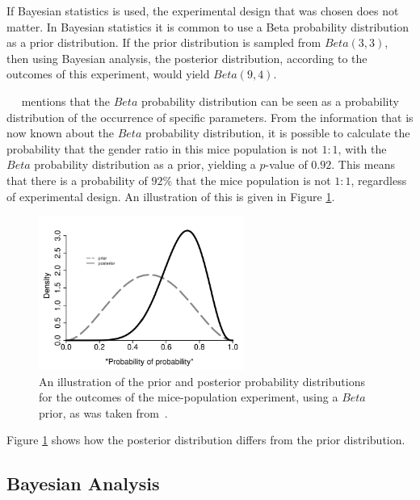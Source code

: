 If Bayesian statistics is used, the experimental design that was chosen does not matter. In Bayesian statistics it is common to use a Beta probability distribution as a prior distribution. If the prior distribution is sampled from $Beta(3,3)$, then using Bayesian analysis, the posterior distribution, according to the outcomes of this experiment, would yield $Beta(9,4)$.

~\citeauthor{ref:hackenberger:2019}~\cite{ref:hackenberger:2019} mentions that the $Beta$ probability distribution can be seen as a probability distribution of the occurrence of specific parameters. From the information that is now known about the $Beta$ probability distribution, it is possible to calculate the probability that the gender ratio in this mice population is not $1:1$, with the $Beta$ probability distribution as a prior, yielding a $p$-value of $0.92$. This means that there is a probability of $92\%$ that the mice population is not $1:1$, regardless of experimental design. An illustration of this is given in Figure \ref{fig:probability:bayesian_statistics:mouse_distributions}.

\begin{figure}[htbp]
	\centering
	\includegraphics[width=0.6\textwidth]{images/mouse_experiment_distributions.pdf}
	\caption{An illustration of the prior and posterior probability distributions for the outcomes of the mice-population experiment, using a $Beta$ prior, as was taken from~\cite{ref:hackenberger:2019}.}
	\label{fig:probability:bayesian_statistics:mouse_distributions}
\end{figure}

Figure \ref{fig:probability:bayesian_statistics:mouse_distributions} shows how the posterior distribution differs from the prior distribution.

\subsection{Bayesian Analysis}
\label{sec:probability:bayesian_statistics:bayesian_analysis}

